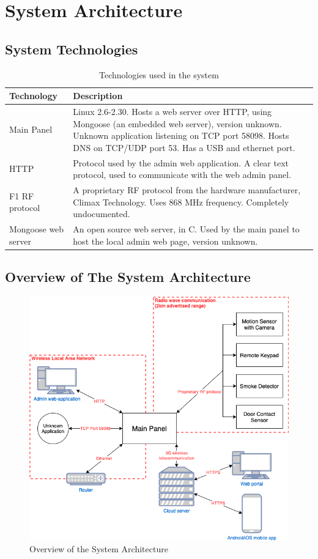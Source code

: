 \section{System Architecture}

\subsection{System Technologies}
\begin{table}[!ht]
    \centering
    \begin{tabularx}{\textwidth}{l X}
        \textbf{Technology}  & \textbf{Description} \\
        \hline
        Main Panel & Linux 2.6-2.30. Hosts a web server over HTTP, using Mongoose (an embedded web server), version unknown. Unknown application listening on TCP port 58098. Hosts DNS on TCP/UDP port 53. Has a USB and ethernet port. \\
        \hline
        HTTP  & Protocol used by the admin web application. A clear text protocol, used to communicate with the web admin panel. \\
        \hline
        F1 RF protocol  & A proprietary \gls{RF} protocol from the hardware manufacturer, Climax Technology. Uses 868 MHz frequency. Completely undocumented. \\
        \hline
        Mongoose web server  & An open source web server, in C. Used by the main panel to host the local admin web page, version unknown. \\
        \hline
    \end{tabularx}
    \caption{Technologies used in the system}
    \label{tb:system-technologies}
\end{table}

\subsection{Overview of The System Architecture}
\begin{figure}[!ht]
    \centering
    \includegraphics[width=\textwidth]{images/system-overview.png}
    \caption{Overview of the System Architecture}
    \label{fig:system-overview}
\end{figure}
